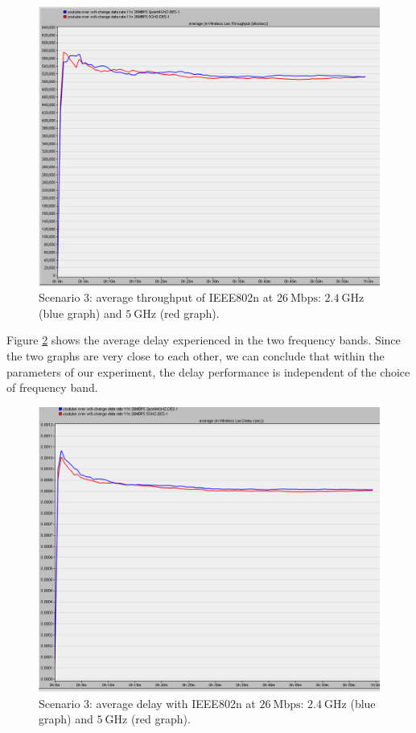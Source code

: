 \begin{figure}[H]
	\centering
	\includegraphics[scale=0.3]{Figures/amantianrenamed/Scenario3AverageThroughputof802.11n26Mbps2.4GHzand802.11n26Mbps5GHz.png}
	\caption[Scenario 3: average throughput according to the frequency band used]{Scenario 3: average throughput of \gls{IEEE802}n at $26~\mathrm{Mbps}$: $2.4~\mathrm{GHz}$ (blue graph) and  $5~\mathrm{GHz}$ (red graph).}
	\label{fig:3:3}
\end{figure}

Figure \ref{fig:3:4} shows the average delay experienced in the two frequency bands. Since the two graphs are very close to each other, we can conclude that within the parameters of our experiment, the delay performance is independent of the choice of frequency band.

\begin{figure}[H]
	\centering
	\includegraphics[scale=0.3]{Figures/amantianrenamed/Scenario3Avedelay11n2624GHz80211n26Mbps5GHz.png}
	\caption[Scenario 3: average delay according to the frequency band used]{Scenario 3: average delay with \gls{IEEE802}n at $26~\mathrm{Mbps}$: $2.4~\mathrm{GHz}$ (blue graph) and  $5~\mathrm{GHz}$ (red graph).}
	\label{fig:3:4}
\end{figure}


